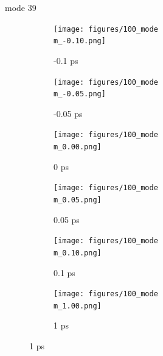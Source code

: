 \documentclass{beamer}
\newcommand\w{0.32}
\begin{document}
\renewcommand\m{39}
\begin{frame}{mode \m}
	\begin{figure}
		\centering
		\begin{subfigure}[b]{\w\textwidth}
			\centering
			\texttt{[image: figures/100\_mode\\m\_-0.10.png]}
			\caption{-0.1 ps}
		\end{subfigure}
		\begin{subfigure}[b]{\w\textwidth}
			\centering
			\texttt{[image: figures/100\_mode\\m\_-0.05.png]}
			\caption{-0.05 ps}
		\end{subfigure}
		\begin{subfigure}[b]{\w\textwidth}
			\centering
			\texttt{[image: figures/100\_mode\\m\_0.00.png]}
			\caption{0 ps}
		\end{subfigure}
		\begin{subfigure}[b]{\w\textwidth}
			\centering
			\texttt{[image: figures/100\_mode\\m\_0.05.png]}
			\caption{0.05 ps}
		\end{subfigure}
		\begin{subfigure}[b]{\w\textwidth}
			\centering
			\texttt{[image: figures/100\_mode\\m\_0.10.png]}
			\caption{0.1 ps}
		\end{subfigure}
		\begin{subfigure}[b]{\w\textwidth}
			\centering
			\texttt{[image: figures/100\_mode\\m\_1.00.png]}
			\caption{1 ps}
		\end{subfigure}
	\end{figure}
\end{frame}
\end{document}
